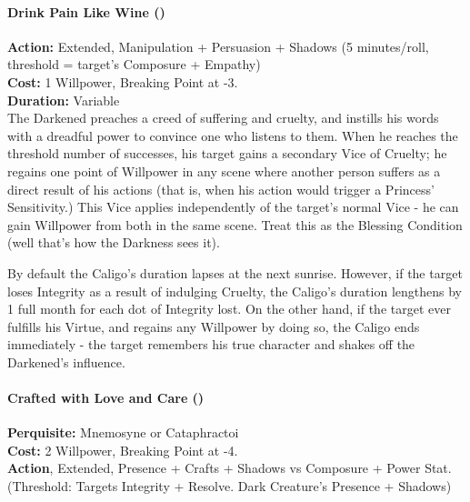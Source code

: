 \paragraph*{Drink Pain Like Wine (\textbullet\textbullet\textbullet\textbullet)}

\noindent \textbf{Action:} Extended, Manipulation + Persuasion + Shadows (5 minutes/roll, threshold = target's Composure + Empathy)\\

\noindent \textbf{Cost:} 1 Willpower, Breaking Point at -3.\\

\noindent \textbf{Duration:} Variable \\

\noindent The Darkened preaches a creed of suffering and cruelty, and instills his words with a dreadful power to convince one who listens to them. When he reaches the threshold number of successes, his target gains a secondary Vice of Cruelty; he regains one point of Willpower in any scene where another person suffers as a direct result of his actions (that is, when his action would trigger a Princess' Sensitivity.) This Vice applies independently of the target's normal Vice - he can gain Willpower from both in the same scene. Treat this as the Blessing Condition (well that's how the Darkness sees it).

By default the Caligo's duration lapses at the next sunrise. However, if the target loses Integrity as a result of indulging Cruelty, the Caligo's duration lengthens by 1 full month for each dot of Integrity lost. On the other hand, if the target ever fulfills his Virtue, and regains any Willpower by doing so, the Caligo ends immediately - the target remembers his true character and shakes off the Darkened's influence.\\

\paragraph*{Crafted with Love and Care (\textbullet\textbullet\textbullet\textbullet\textbullet)} 

\noindent \textbf{Perquisite:} Mnemosyne or Cataphractoi\\

\noindent \textbf{Cost:} 2 Willpower, Breaking Point at -4.\\

\noindent \textbf{Action}, Extended, Presence + Crafts + Shadows vs Composure + Power Stat. (Threshold: Targets Integrity + Resolve. Dark Creature's Presence + Shadows)\\

